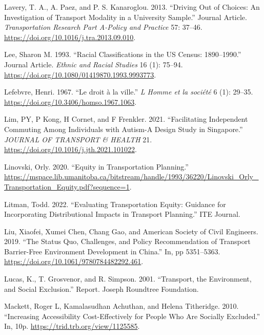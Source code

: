 \documentclass[12pt, oneside]{report}
\newlength{\cslhangindent}
\newlength{\cslentryspacingunit} %
\newenvironment{CSLReferences}[2] %
 {%
  \setlength{\parindent}{0pt}
  \ifodd #1
  \let\oldpar\par
  \def\par{\hangindent=\cslhangindent\oldpar}
  \fi
  \setlength{\parskip}{#2\cslentryspacingunit}
 }%
 {}
\begin{document}
\begin{CSLReferences}{1}{0}
\leavevmode{}%
Lavery, T. A., A. Paez, and P. S. Kanaroglou. 2013. {``Driving Out of
Choices: An Investigation of Transport Modality in a University
Sample.''} Journal Article. \emph{Transportation Research Part A-Policy
and Practice} 57: 37--46.
\url{https://doi.org/10.1016/j.tra.2013.09.010}.

\leavevmode{}%
Lee, Sharon M. 1993. {``Racial Classifications in the US Census:
1890--1990.''} Journal Article. \emph{Ethnic and Racial Studies} 16 (1):
75--94. \url{https://doi.org/10.1080/01419870.1993.9993773}.

\leavevmode{}%
Lefebvre, Henri. 1967. {``Le droit à la ville.''} \emph{L Homme et la
société} 6 (1): 29--35. \url{https://doi.org/10.3406/homso.1967.1063}.

\leavevmode{}%
Lim, PY, P Kong, H Cornet, and F Frenkler. 2021. {``Facilitating
Independent Commuting Among Individuals with Autism-{A} Design Study in
{Singapore}.''} \emph{JOURNAL OF TRANSPORT \& HEALTH} 21.
\url{https://doi.org/10.1016/j.jth.2021.101022}.

\leavevmode{}%
Linovski, Orly. 2020. {``Equity in {Transportation Planning}.''}
\url{https://mspace.lib.umanitoba.ca/bitstream/handle/1993/36220/Linovski_Orly_Transportation_Equity.pdf?sequence=1}.

\leavevmode{}%
Litman, Todd. 2022. {``Evaluating {Transportation Equity}: {Guidance}
for {Incorporating Distributional Impacts} in {Transport Planning}.''}
{ITE Journal}.

\leavevmode{}%
Liu, Xiaofei, Xumei Chen, Chang Gao, and American Society of Civil
Engineers. 2019. {``The {Status Quo}, {Challenges}, and {Policy
Recommendation} of {Transport Barrier-Free Environment Development} in
{China}.''} In, pp 5351--5363.
\url{https://doi.org/10.1061/9780784482292.461}.

\leavevmode{}%
Lucas, K., T. Grosvenor, and R. Simpson. 2001. {``Transport, the
Environment, and Social Exclusion.''} Report. Joseph Roundtree
Foundation.

\leavevmode{}%
Mackett, Roger L, Kamalasudhan Achuthan, and Helena Titheridge. 2010.
{``Increasing Accessibility Cost-Effectively for People Who Are Socially
Excluded.''} In, 10p. \url{https://trid.trb.org/view/1125585}.


\end{CSLReferences}
\end{document}
